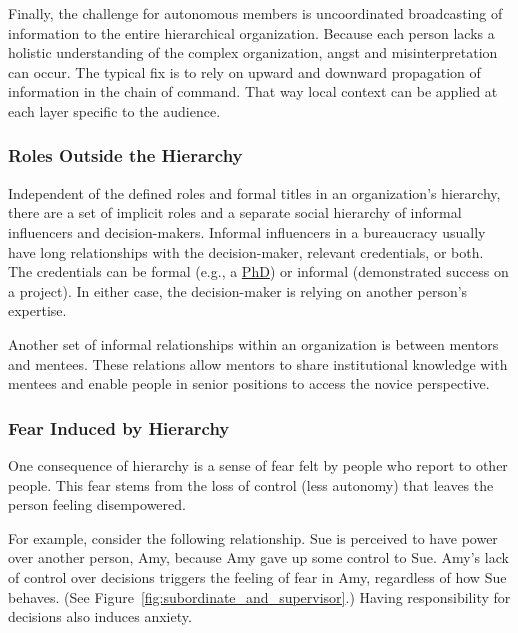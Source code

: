 Finally, the challenge for autonomous members is uncoordinated broadcasting of information to the entire hierarchical organization. Because each person lacks a holistic understanding of the complex organization, angst and misinterpretation can occur. The typical fix is to rely on upward and downward propagation of information in the chain of command. That way local context can be applied at each layer specific to the audience.

\subsubsection*{Roles Outside the Hierarchy}

Independent of the defined roles and formal titles in an organization's hierarchy, there are a set of implicit roles and a separate social hierarchy of informal influencers and decision-makers. Informal influencers in a bureaucracy usually have long relationships with the decision-maker, relevant credentials, or both. The credentials can be formal (e.g., a \href{https://en.wikipedia.org/wiki/Doctor_of_Philosophy}{PhD}) 
\iftoggle{WPinmargin}{\marginpar{$>$Wikipedia: Doctor of Philosophy}}{}
or informal (demonstrated success on a project). In either case, the decision-maker is relying on another person's expertise. 

Another set of informal relationships within an organization is between mentors and mentees. These relations allow mentors to share institutional knowledge with mentees and enable people in senior positions to access the novice perspective. 


\subsubsection*{Fear Induced by Hierarchy}

One consequence of hierarchy is a sense of fear felt by people who report to other people. This fear stems from the loss of control (less autonomy) that leaves the person feeling disempowered. 

For example, consider the following relationship. Sue is perceived to have power over another person, Amy, because Amy gave up some control to Sue. Amy's lack of control over decisions triggers the feeling of fear in Amy, regardless of how Sue behaves. (See Figure~\ref{fig:subordinate_and_supervisor}.) Having responsibility for decisions also induces anxiety.

